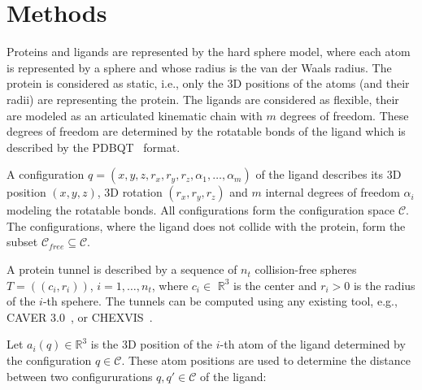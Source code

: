 \documentclass{bmcart}
\def\C{\mathcal{C}}
\def\CF{\mathcal{C}_{free}}
\def\R{\mathbb{R}}
\begin{document}
%



\section*{Methods}


Proteins and ligands are represented by the hard sphere model, where each atom is represented by a sphere and whose radius 
is the van der Waals radius.
The protein is considered as static, i.e., only the 3D positions of the atoms (and their radii) are representing the protein.
The ligands are considered as flexible, their are modeled as an articulated kinematic chain with $m$ degrees of freedom.
These degrees of freedom are determined by the rotatable bonds of the ligand which is described by the PDBQT~\cite{pdbqt} format.

A configuration $q=(x,y,z,r_x,r_y,r_z, \alpha_1,\ldots,\alpha_m)$ of the ligand describes its 3D 
position $(x,y,z)$, 3D rotation $(r_x,r_y,r_z)$ and $m$ internal degrees of freedom $\alpha_i$ modeling  the rotatable bonds.
All configurations form the configuration space $\C$.
The configurations, where the ligand does not collide with the protein, form the subset $\CF \subseteq \C$.

A protein tunnel is described by a sequence of $n_t$ collision-free spheres $T=( (c_i, r_i) )$, $i=1,\ldots,n_t$, 
where $c_i \in$ $\mathbb{R}^3$ is the center and $r_i > 0$ is the radius of the $i$-th spehere.
The tunnels can be computed using any existing tool, e.g., CAVER 3.0~\cite{caver3}, or CHEXVIS~\cite{masood2015chexvis}.

Let $a_i(q) \in \R^3$ is the 3D position of the $i$-th atom of the ligand determined by the configuration $q \in \C$.
These atom positions are used to determine the distance between two  configururations $q,q' \in \C$ of the ligand:
\end{document}
